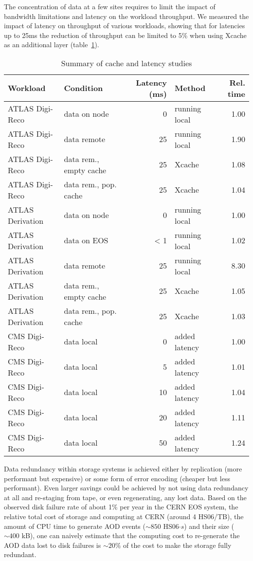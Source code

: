 The concentration of data at a few sites requires to limit the impact
of bandwidth limitations and latency on the workload throughput.  We
measured the impact of latency on throughput of various workloads,
showing that for latencies up to 25ms the reduction of throughput can
be limited to 5\% when using Xcache as an additional layer
(table~\ref{tab:latency}).
\begin{table}
  \centering
  \caption{ Summary of cache and latency studies}
  \label{tab:latency}
  \begin{tabular}{llrlr}
    \hline
    Workload & Condition & Latency (ms) & Method & Rel. time \\\hline
    ATLAS Digi-Reco & data on node & 0 & running local & 1.00 \\ 
    ATLAS Digi-Reco & data remote & ~25 & running local & 1.90 \\ 
    ATLAS Digi-Reco & data rem., empty cache & ~25 & Xcache & 1.08 \\ 
    ATLAS Digi-Reco & data rem., pop. cache & ~25 & Xcache & 1.04 \\ 
    ATLAS Derivation & data on node & 0 & running local & 1.00 \\ 
    ATLAS Derivation & data on EOS & < 1 & running local  & 1.02 \\ 
    ATLAS Derivation & data remote & ~25 & running local & 8.30 \\ 
    ATLAS Derivation & data rem., empty cache & ~25 & Xcache & 1.05 \\ 
    ATLAS Derivation & data rem., pop. cache & ~25 & Xcache & 1.03 \\
    CMS Digi-Reco & data local & 0 & added latency & 1.00 \\
    CMS Digi-Reco & data local & 5 & added latency & 1.01 \\
    CMS Digi-Reco & data local & 10 & added latency & 1.04 \\
    CMS Digi-Reco & data local & 20 & added latency & 1.11 \\
    CMS Digi-Reco & data local & 50 & added latency & 1.24 \\\hline
  \end{tabular}
\end{table}

Data redundancy within storage systems is achieved either by
replication (more performant but expensive) or some form of error
encoding (cheaper but less performant). Even larger savings could be
achieved by not using data redundancy at all and re-staging from
tape, or even regenerating, any lost data.
Based on the observed disk failure rate of about 1\% per year in the
CERN EOS system, the relative total cost
of storage and computing at CERN (around 4 HS06/TB), the amount of CPU
time to generate AOD events ($\sim 850$ HS06$\cdot s$) and their size
($\sim 400$ kB), one can naively estimate that the computing cost to
re-generate the AOD data lost to disk failures is $\sim 20\%$ of the
cost to make the storage fully redundant.

